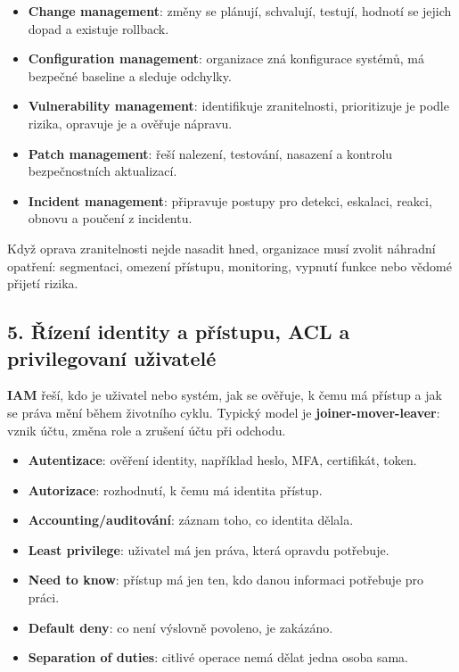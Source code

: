 \begin{itemize}
    \item \textbf{Change management}: změny se plánují, schvalují, testují, hodnotí se jejich dopad a existuje rollback.
    \item \textbf{Configuration management}: organizace zná konfigurace systémů, má bezpečné baseline a sleduje odchylky.
    \item \textbf{Vulnerability management}: identifikuje zranitelnosti, prioritizuje je podle rizika, opravuje je a ověřuje nápravu.
    \item \textbf{Patch management}: řeší nalezení, testování, nasazení a kontrolu bezpečnostních aktualizací.
    \item \textbf{Incident management}: připravuje postupy pro detekci, eskalaci, reakci, obnovu a poučení z incidentu.
\end{itemize}

Když oprava zranitelnosti nejde nasadit hned, organizace musí zvolit náhradní opatření: segmentaci, omezení přístupu, monitoring, vypnutí funkce nebo vědomé přijetí rizika.


\subsection*{5. Řízení identity a přístupu, ACL a privilegovaní uživatelé}

\textbf{IAM} řeší, kdo je uživatel nebo systém, jak se ověřuje, k čemu má přístup a jak se práva mění během životního cyklu. Typický model je \textbf{joiner-mover-leaver}: vznik účtu, změna role a zrušení účtu při odchodu.

\begin{itemize}
    \item \textbf{Autentizace}: ověření identity, například heslo, MFA, certifikát, token.
    \item \textbf{Autorizace}: rozhodnutí, k čemu má identita přístup.
    \item \textbf{Accounting/auditování}: záznam toho, co identita dělala.
    \item \textbf{Least privilege}: uživatel má jen práva, která opravdu potřebuje.
    \item \textbf{Need to know}: přístup má jen ten, kdo danou informaci potřebuje pro práci.
    \item \textbf{Default deny}: co není výslovně povoleno, je zakázáno.
    \item \textbf{Separation of duties}: citlivé operace nemá dělat jedna osoba sama.
\end{itemize}

